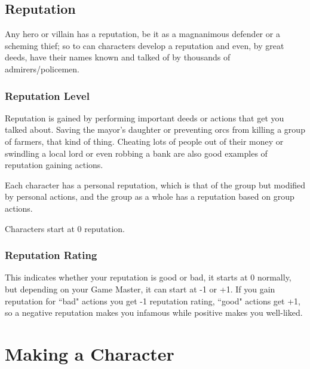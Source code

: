 \documentclass[a4paper,10pt,oneside]{book}
\begin{document}
\section{Reputation}
Any hero or villain has a reputation, be it as a magnanimous defender or a scheming thief; so to can characters develop a reputation and even, by great deeds, have their names known and talked of by thousands of admirers/policemen. 

\subsection{Reputation Level}
Reputation is gained by performing important deeds or actions that get you talked about. Saving the mayor's daughter or preventing orcs from killing a group of farmers, that kind of thing. Cheating lots of people out of their money or swindling a local lord or even robbing a bank are also good examples of reputation gaining actions.

Each character has a personal reputation, which is that of the group but modified by personal actions, and the group as a whole has a reputation based on group actions.

Characters start at 0 reputation.

\subsection{Reputation Rating}
This indicates whether your reputation is good or bad, it starts at 0 normally, but depending on your Game Master, it can start at -1 or +1. If you gain reputation for ``bad" actions you get -1 reputation rating, ``good" actions get +1, so a negative reputation makes you infamous while positive makes you well-liked.





\chapter{Making a Character}
\end{document}
